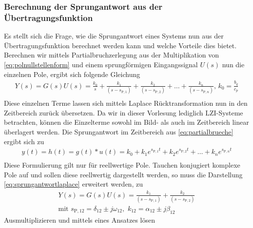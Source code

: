 \subsubsection{Berechnung der Sprungantwort aus der Übertragungsfunktion}
%
Es stellt sich die Frage, wie die Sprungantwort eines Systems nun aus der Übertragungsfunktion berechnet werden kann und welche Vorteile dies bietet. Berechnen wir mittels Partialbruchzerlegung aus der Multiplikation von \eqref{eq:polnullstellenform} und einem sprungförmigen Eingangssignal $U(s)$ nun die einzelnen Pole, ergibt sich folgende Gleichung
%
\begin{equation}
\begin{aligned}
Y(s)=G(s)U(s)=\frac{k_{0}}{s}+\frac{k_{1}}{\left(s-s_{\text{P},1}\right)}+\frac{k_{2}}{\left(s-s_{\text{P},2}\right)}+\ldots+\frac{k_{n}}{\left(s-s_{\text{P},n}\right)},\, k_{0}=\frac{b_{q}}{c_{p}}\label{eq:partialbrueche}\\
\end{aligned}
\end{equation}
%
Diese einzelnen Terme lassen sich mittels Laplace Rücktransformation nun in den Zeitbereich zurück übersetzen. Da wir in dieser Vorlesung lediglich LZI-Systeme betrachten, können die Einzelterme sowohl im Bild- als auch im Zeitbereich linear überlagert werden. Die Sprungantwort im Zeitbereich aus \eqref{eq:partialbrueche} ergibt sich zu 
%
\begin{equation}
\begin{aligned}
y(t)=h(t)=g(t)*u(t)=k_{0}+k_{1}e^{s_{\text{P},1}t}+k_{2}e^{s_{\text{P},2}t}+\ldots+k_{n}e^{s_{\text{P},n}t}\label{eq:sprungantwortlaplace}\\
\end{aligned}
\end{equation}
%
Diese Formulierung gilt nur für reellwertige Pole. Tauchen konjugiert komplexe Pole auf und sollen diese reellwertig dargestellt werden, so muss die Darstellung \eqref{eq:sprungantwortlaplace} erweitert werden, zu
%
\begin{equation*}
\begin{aligned}
%
Y(s)=G(s)U(s)=\frac{k_{1}}{\left(s-s_{\text{P},1}\right)}+\frac{k_{2}}{\left(s-s_{\text{P},2}\right)}\\
\text{mit}\,\, s_{\text{P},12}=\delta_{12}\pm j\omega_{12},\,\,k_{12}=\alpha_{12}\pm j\beta_{12}
%
\end{aligned}
\end{equation*}
%
Ausmultiplizieren und mittels eines Ansatzes lösen
